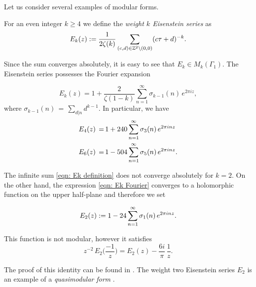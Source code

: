   Let us consider several examples of modular forms.
  \begin{definition}\label{def: Ek definition}
  For an even integer $k\geq 4$ we define the \emph{weight $k$ Eisenstein series} as
  \begin{equation}\label{eqn: Ek definition}E_k(z):=\frac{1}{2\zeta(k)}\sum_{(c,d)\in\mathbb{Z}^2\backslash(0,0)}(c\tau+d)^{-k}.\end{equation}
  \end{definition}
  Since the sum converges absolutely, it is easy to see that $E_k\in M_k(\Gamma_1)$. The
  Eisenstein series possesses the Fourier expansion
  \begin{lemma}\label{lemma: Ek Fourier}
  \begin{equation}\label{eqn: Ek Fourier}E_k(z)=1+\frac{2}{\zeta(1-k)}\sum_{n=1}^\infty \sigma_{k-1}(n)\,e^{2\pi i z}, \end{equation}
  where $\sigma_{k-1}(n)\,=\,\sum_{d|n} d^{k-1}$. In particular, we have
  \begin{align}
    E_4(z)\,=\,& 1+240\sum_{n=1}^\infty \sigma_3(n)\,e^{2\pi i n z} \notag \\
    E_6(z)\,=\,& 1-504\sum_{n=1}^\infty \sigma_5(n)\,e^{2\pi i n z}. \notag
  \end{align}
  \end{lemma}
  The infinite sum \eqref{eqn: Ek definition} does not converge absolutely for $k=2$. On the other hand, the expression \eqref{eqn: Ek Fourier} converges to a holomorphic function on the upper half-plane and therefore we set
  \begin{definition} \label{def: E2 def}
  \begin{equation}E_2(z):= 1-24\sum_{n=1}^\infty \sigma_1(n)\,e^{2\pi i n z}.\notag\end{equation}
  \end{definition}
  \begin{lemma}
  \label{lemma: E2 transform}
  This function is not modular, however it satisfies
  \begin{equation}\label{eqn: E2 transform}z^{-2}\,E_2\Big(\frac{-1}{z}\Big)=E_2(z) -\frac{6i}{\pi}\, \frac{1}{z}.\end{equation}
  \end{lemma}
  The proof of this identity can be found in \cite[Section~2.3]{1-2-3}.
  The weight two Eisenstein series $E_2$ is an example of a \emph{quasimodular form} \cite[Section~5.1]{1-2-3}.

